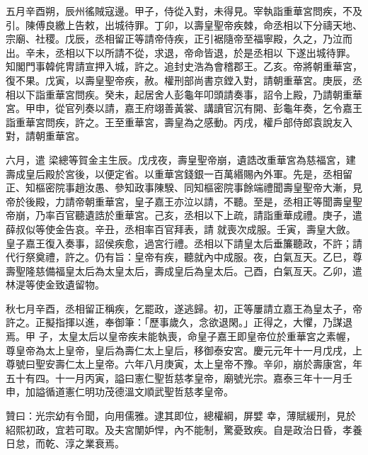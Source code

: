 \begin{pinyinscope}
 五月辛酉朔，辰州徭賊寇邊。甲子，侍從入對，未得見。宰執詣重華宮問疾，不及引。陳傅良繳上告敕，出城待罪。丁卯，以壽皇聖帝疾棘，命丞相以下分禱天地、宗廟、社稷。戊辰，丞相留正等請帝侍疾，正引裾隨帝至福寧殿，久之，乃泣而出。辛未，丞相以下以所請不從，求退，帝命皆退，於是丞相以
 下遂出城待罪。知閣門事韓侂冑請宣押入城，許之。追封史浩為會稽郡王。乙亥。帝將朝重華宮，復不果。戊寅，以壽皇聖帝疾，赦。權刑部尚書京鏜入對，請朝重華宮。庚辰，丞相以下詣重華宮問疾。癸未，起居舍人彭龜年叩頭請奏事，詔令上殿，乃請朝重華宮。甲申，從官列奏以請，嘉王府翊善黃裳、講讀官沉有開、彭龜年奏，乞令嘉王詣重華宮問疾，許之。王至重華宮，壽皇為之感動。丙戌，權戶部侍郎袁說友入對，請朝重華宮。



 六月，遣
 梁總等賀金主生辰。戊戌夜，壽皇聖帝崩，遺誥改重華宮為慈福宮，建壽成皇后殿於宮後，以便定省。以重華宮錢銀一百萬緡賜內外軍。先是，丞相留正、知樞密院事趙汝愚、參知政事陳騤、同知樞密院事餘端禮聞壽皇聖帝大漸，見帝於後殿，力請帝朝重華宮，皇子嘉王亦泣以請，不聽。至是，丞相正等聞壽皇聖帝崩，乃率百官聽遺誥於重華宮。己亥，丞相以下上疏，請詣重華成禮。庚子，遣薛叔似等使金告哀。辛丑，丞相率百官拜表，請
 就喪次成服。壬寅，壽皇大斂。皇子嘉王復入奏事，詔侯疾愈，過宮行禮。丞相以下請皇太后垂簾聽政，不許；請代行祭奠禮，許之。仍有旨：皇帝有疾，聽就內中成服。夜，白氣亙天。乙巳，尊壽聖隆慈備福皇太后為太皇太后，壽成皇后為皇太后。己酉，白氣亙天。乙卯，遣林湜等使金致遺留物。



 秋七月辛酉，丞相留正稱疾，乞罷政，遂逃歸。初，正等屢請立嘉王為皇太子，帝許之。正擬指揮以進，奉御筆：「歷事歲久，念欲退閑。」正得之，大懼，乃謀退焉。甲
 子，太皇太后以皇帝疾未能執喪，命皇子嘉王即皇帝位於重華宮之素幄，尊皇帝為太上皇帝，皇后為壽仁太上皇后，移御泰安宮。慶元元年十一月戊戌，上尊號曰聖安壽仁太上皇帝。六年八月庚寅，太上皇帝不豫。辛卯，崩於壽康宮，年五十有四。十一月丙寅，謚曰憲仁聖哲慈孝皇帝，廟號光宗。嘉泰三年十一月壬申，加謚循道憲仁明功茂德溫文順武聖哲慈孝皇帝。



 贊曰：光宗幼有令聞，向用儒雅。逮其即位，總權綱，屏嬖
 幸，薄賦緩刑，見於紹熙初政，宜若可取。及夫宮闈妒悍，內不能制，驚憂致疾。自是政治日昏，孝養日怠，而乾、淳之業衰焉。



\end{pinyinscope}
